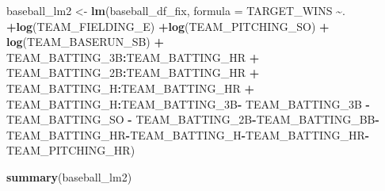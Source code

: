 \documentclass[
]{article}
\newenvironment{Shaded}{\begin{snugshade}}{\end{snugshade}}
\newcommand{\DataTypeTok}[1]{\textcolor[rgb]{0.13,0.29,0.53}{#1}}
\newcommand{\KeywordTok}[1]{\textcolor[rgb]{0.13,0.29,0.53}{\textbf{#1}}}
\newcommand{\NormalTok}[1]{#1}
\newcommand{\OperatorTok}[1]{\textcolor[rgb]{0.81,0.36,0.00}{\textbf{#1}}}
\newcommand{\StringTok}[1]{\textcolor[rgb]{0.31,0.60,0.02}{#1}}
\begin{document}
\begin{Shaded}
\begin{Highlighting}[]
\NormalTok{baseball\_lm2 \textless{}{-}}\StringTok{ }\KeywordTok{lm}\NormalTok{(baseball\_df\_fix, }\DataTypeTok{formula =}\NormalTok{ TARGET\_WINS }\OperatorTok{\textasciitilde{}}\NormalTok{. }\OperatorTok{+}\KeywordTok{log}\NormalTok{(TEAM\_FIELDING\_E) }\OperatorTok{+}\KeywordTok{log}\NormalTok{(TEAM\_PITCHING\_SO) }\OperatorTok{+}\StringTok{ }\KeywordTok{log}\NormalTok{(TEAM\_BASERUN\_SB) }\OperatorTok{+}\StringTok{ }\NormalTok{TEAM\_BATTING\_3B}\OperatorTok{:}\NormalTok{TEAM\_BATTING\_HR }\OperatorTok{+}\StringTok{ }\NormalTok{TEAM\_BATTING\_2B}\OperatorTok{:}\NormalTok{TEAM\_BATTING\_HR }\OperatorTok{+}\StringTok{  }\NormalTok{TEAM\_BATTING\_H}\OperatorTok{:}\NormalTok{TEAM\_BATTING\_HR }\OperatorTok{+}\StringTok{ }\NormalTok{TEAM\_BATTING\_H}\OperatorTok{:}\NormalTok{TEAM\_BATTING\_3B}\OperatorTok{{-}}\StringTok{ }\NormalTok{TEAM\_BATTING\_3B }\OperatorTok{{-}}\StringTok{ }\NormalTok{TEAM\_BATTING\_SO }\OperatorTok{{-}}\StringTok{ }\NormalTok{TEAM\_BATTING\_2B}\OperatorTok{{-}}\NormalTok{TEAM\_BATTING\_BB}\OperatorTok{{-}}\NormalTok{TEAM\_BATTING\_HR}\OperatorTok{{-}}\NormalTok{TEAM\_BATTING\_H}\OperatorTok{{-}}\NormalTok{TEAM\_BATTING\_HR}\OperatorTok{{-}}\StringTok{ }\NormalTok{TEAM\_PITCHING\_HR)}


\KeywordTok{summary}\NormalTok{(baseball\_lm2)}
\end{Highlighting}
\end{Shaded}
\end{document}
